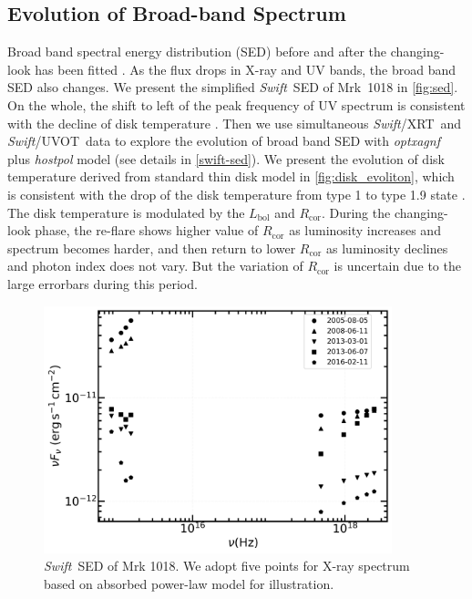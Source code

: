 \documentclass[twocolumn]{aastex63}
\newcommand{\swift}{{\small \it Swift}}
\newcommand{\xrt}{{\small {\it Swift}/XRT}}
\newcommand{\uvot}{{\small {\it Swift}/UVOT}}
\begin{document}

\subsection{Evolution of Broad-band Spectrum}
\label{subsec:xray-uvot-sed}
Broad band spectral energy distribution (SED) before and after the changing-look has been fitted \citep[see][]{2016A&A...593L...9H,2018MNRAS.480.3898N}. As the flux drops in X-ray and UV bands, the broad band SED also changes. We present the simplified \swift \, SED of Mrk~1018 in \autoref{fig:sed}. On the whole, the shift to left of the peak frequency of UV spectrum is consistent with the decline of disk temperature \citep[also described in][]{2016A&A...593L...9H}. Then we use simultaneous \xrt\, and \uvot\, data to explore the evolution of broad band SED with {\it optxagnf} plus {\it hostpol} model (see details in \autoref{swift-sed}).  We present the evolution of disk temperature derived from standard thin disk model in \autoref{fig:disk_evoliton}, which is consistent with the drop of the disk temperature from type 1 to type 1.9 state . The disk temperature is modulated by the $L_\mathrm{bol}$ and $R_\mathrm{cor}$. During the changing-look phase, the re-flare shows higher value of $R_\mathrm{cor}$ as luminosity increases and spectrum becomes harder, and then return to lower $R_\mathrm{cor}$ as luminosity declines and photon index does not vary. But the variation of $R_\mathrm{cor}$ is uncertain due to the large errorbars during this period. 
\begin{figure}
\centering
	\includegraphics[width=0.9\textwidth]{./pic/Mrk1018_sed_date.png}
    \caption{\swift \, SED of Mrk 1018. We adopt five points for X-ray spectrum based on absorbed power-law model for illustration.}
    \label{fig:sed}
\end{figure}
\end{document}

